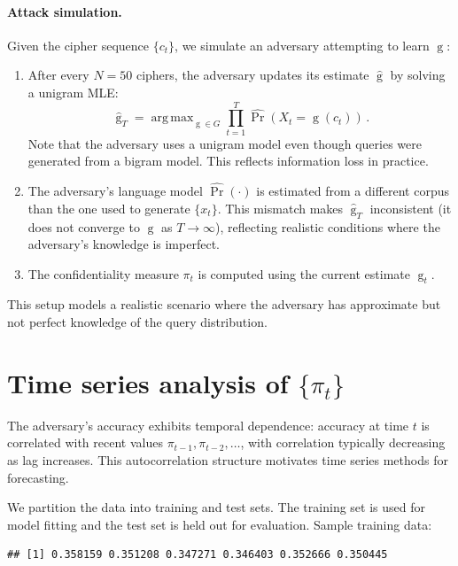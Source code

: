 \documentclass[final,11pt]{article}
\newcommand{\argmax}{\operatorname{arg\,max}}
\theoremstyle{plain}
\theoremstyle{remark}
\begin{document}
\paragraph{Attack simulation.}
Given the cipher sequence $\{c_t\}$, we simulate an adversary attempting
to learn $\operatorname{g}$:
\begin{enumerate}
\item After every $N=50$ ciphers, the adversary updates its estimate
$\hat{\operatorname{g}}$ by solving a unigram MLE:
$$
    \hat{\operatorname{g}}_T = \argmax_{\operatorname{g} \in G}
    \prod_{t=1}^{T} \hat{\Pr}(X_t = \operatorname{g}(c_t))\,.
$$
Note that the adversary uses a unigram model even though queries were
generated from a bigram model. This reflects information loss in practice.
\item The adversary's language model $\hat{\Pr}(\cdot)$ is estimated from
a different corpus than the one used to generate $\{x_t\}$. This mismatch
makes $\hat{\operatorname{g}}_T$ inconsistent (it does not converge to
$\operatorname{g}$ as $T \to \infty$), reflecting realistic conditions
where the adversary's knowledge is imperfect.
\item The confidentiality measure $\pi_t$ is computed using the current
estimate $\hat{\operatorname{g}}_t$.
\end{enumerate}

This setup models a realistic scenario where the adversary has approximate
but not perfect knowledge of the query distribution.

\hypertarget{time-series-analysis-of-pi_t}{%
\section{\texorpdfstring{Time series analysis of
\(\{\pi_t\}\)}{Time series analysis of \textbackslash\{\textbackslash pi\_t\textbackslash\}}}\label{time-series-analysis-of-pi_t}}

The adversary's accuracy exhibits temporal dependence: accuracy at time $t$
is correlated with recent values $\pi_{t-1}, \pi_{t-2}, \ldots$, with
correlation typically decreasing as lag increases. This autocorrelation
structure motivates time series methods for forecasting.

We partition the data into training and test sets. The training set is used
for model fitting and the test set is held out for evaluation. Sample
training data:

\begin{verbatim}
## [1] 0.358159 0.351208 0.347271 0.346403 0.352666 0.350445
\end{verbatim}
\end{document}
